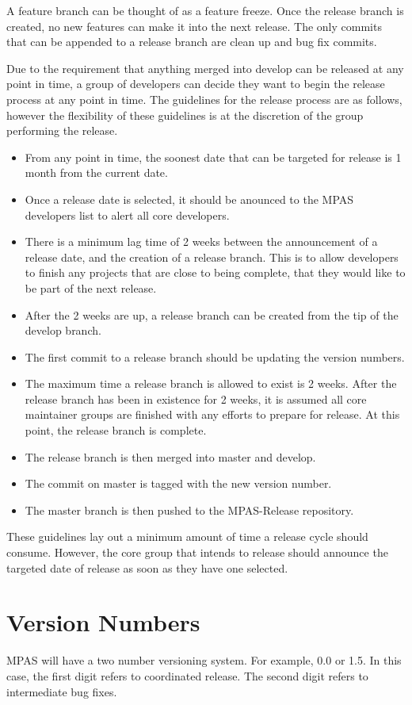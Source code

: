 \documentclass[11pt]{report}
\begin{document}
A feature branch can be thought of as a feature freeze. Once the release branch
is created, no new features can make it into the next release. The only commits
that can be appended to a release branch are clean up and bug fix commits.

Due to the requirement that anything merged into develop can be released at any
point in time, a group of developers can decide they want to begin the release
process at any point in time. The guidelines for the release process are as
follows, however the flexibility of these guidelines is at the discretion of
the group performing the release.
\begin{itemize}
	\item From any point in time, the soonest date that can be targeted for release is 1 month from the current date.
	\item Once a release date is selected, it should be anounced to the MPAS developers list to alert all core developers.
	\item There is a minimum lag time of 2 weeks between the announcement of a release date, and the creation of a release branch. This is to allow developers to finish any projects that are close to being complete, that they would like to be part of the next release.
	\item After the 2 weeks are up, a release branch can be created from the tip of the develop branch.
	\item The first commit to a release branch should be updating the version numbers.
	\item The maximum time a release branch is allowed to exist is 2 weeks. After the release branch has been in existence for 2 weeks, it is assumed all core maintainer groups are finished with any efforts to prepare for release. At this point, the release branch is complete.
	\item The release branch is then merged into master and develop.
	\item The commit on master is tagged with the new version number.
	\item The master branch is then pushed to the MPAS-Release repository.
\end{itemize}

These guidelines lay out a minimum amount of time a release cycle should
consume. However, the core group that intends to release should announce the
targeted date of release as soon as they have one selected.

\section{Version Numbers}
\label{sec:version-numbers}
MPAS will have a two number versioning system. For example, 0.0 or 1.5. In this
case, the first digit refers to coordinated release. The second digit refers to
intermediate bug fixes.
\end{document}
